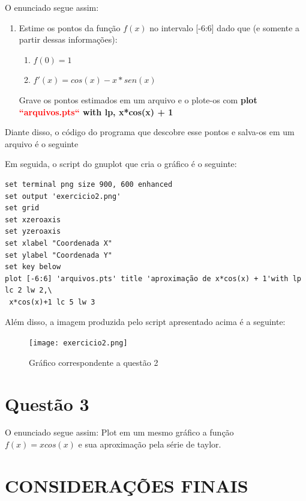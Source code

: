 \documentclass[acmlarge,screen]{acmart}
\begin{document}
O enunciado segue assim:
\newline
\begin{enumerate}
    \item Estime os pontos da função $f(x)$ no intervalo [-6:6] dado que (e somente a partir dessas informações):
    
    \begin{enumerate}
        \item $f(0) = 1$
        \item $f'(x) = cos(x) - x*sen(x)$
        
    \end{enumerate}
    
    Grave os pontos estimados em um arquivo e o plote-os com \newline
    \textbf{plot \textcolor{red}{``arquivos.pts``} with lp, x*cos(x) + 1}
    
\end{enumerate}


Diante disso, o código do programa que descobre esse pontos e salva-os em um arquivo é o seguinte



Em seguida, o script do gnuplot que cria o gráfico é o seguinte:

\begin{lstlisting}[htb]
set terminal png size 900, 600 enhanced
set output 'exercicio2.png'
set grid
set xzeroaxis
set yzeroaxis
set xlabel "Coordenada X"
set ylabel "Coordenada Y"
set key below
plot [-6:6] 'arquivos.pts' title 'aproximação de x*cos(x) + 1'with lp lc 2 lw 2,\
 x*cos(x)+1 lc 5 lw 3 
\end{lstlisting}
 
 Além disso, a imagem produzida pelo script apresentado acima é a seguinte:
 
\begin{figure}[htb]
    \centering
    \texttt{[image: exercicio2.png]}
    \caption{Gráfico correspondente a questão 2}
    \label{fig:my_label}
\end{figure}


\section{Questão 3}

O enunciado segue assim:
\newline
Plot em um mesmo gráfico a função $f(x) = xcos(x)$ e sua aproximação pela série de taylor.
\section{CONSIDERAÇÕES FINAIS}
\end{document}
